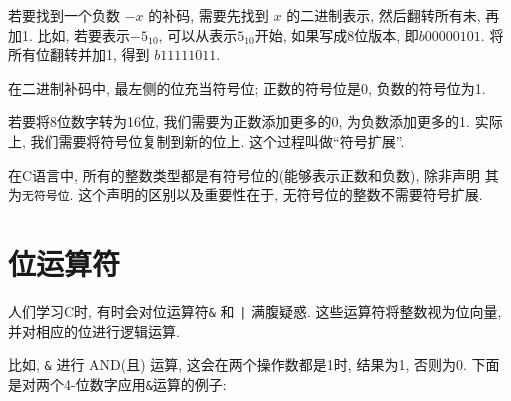 \documentclass[12pt]{book}
\begin{document}
{%
若要找到一个负数 $-x$ 的补码, 需要先找到 $x$ 的二进制表示, 然后翻转所有未, 再加1.
比如, 若要表示$-5_{10}$, 可以从表示$5_{10}$开始, 如果写成8位版本, 即$b0000 0101$.
将所有位翻转并加1, 得到 $b1111 1011$.

在二进制补码中, 最左侧的位充当符号位; 正数的符号位是0, 负数的符号位为1.

若要将8位数字转为16位, 我们需要为正数添加更多的0, 为负数添加更多的1.
实际上, 我们需要将符号位复制到新的位上. 这个过程叫做``符号扩展''.

在C语言中, 所有的整数类型都是有符号位的(能够表示正数和负数), 除非声明
其为{\tt 无符号位}. 这个声明的区别以及重要性在于, 无符号位的整数不需要符号扩展.

\section{位运算符}

人们学习C时, 有时会对位运算符\verb"&" 和 \verb"|" 满腹疑惑. 
这些运算符将整数视为位向量, 并对相应的位进行逻辑运算.

比如,  \verb"&" 进行 AND(且) 运算, 这会在两个操作数都是1时, 结果为1, 否则为0.
下面是对两个4-位数字应用\verb"&"运算的例子:

}
\end{document}
